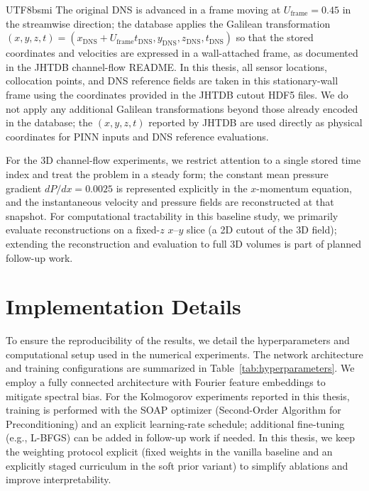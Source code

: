 \documentclass[master]{NTHUthesis}
\begin{document}
\begin{CJK*}{UTF8}{bsmi}
The original DNS is advanced in a frame moving at $U_{\text{frame}} = 0.45$ in the streamwise direction; the database applies the Galilean transformation $(x,y,z,t) = (x_{\text{DNS}} + U_{\text{frame}} t_{\text{DNS}}, y_{\text{DNS}}, z_{\text{DNS}}, t_{\text{DNS}})$ so that the stored coordinates and velocities are expressed in a wall-attached frame, as documented in the JHTDB channel-flow README. In this thesis, all sensor locations, collocation points, and DNS reference fields are taken in this stationary-wall frame using the coordinates provided in the JHTDB cutout HDF5 files.
We do not apply any additional Galilean transformations beyond those already encoded in the database; the $(x,y,z,t)$ reported by JHTDB are used directly as physical coordinates for PINN inputs and DNS reference evaluations.

For the 3D channel-flow experiments, we restrict attention to a single stored time index and treat the problem in a steady form; the constant mean pressure gradient $dP/dx = 0.0025$ is represented explicitly in the $x$-momentum equation, and the instantaneous velocity and pressure fields are reconstructed at that snapshot. For computational tractability in this baseline study, we primarily evaluate reconstructions on a fixed-$z$ $x$--$y$ slice (a 2D cutout of the 3D field); extending the reconstruction and evaluation to full 3D volumes is part of planned follow-up work.

\section{Implementation Details}
\label{sec:implementation}

To ensure the reproducibility of the results, we detail the hyperparameters and computational setup used in the numerical experiments.
The network architecture and training configurations are summarized in Table~\ref{tab:hyperparameters}.
We employ a fully connected architecture with Fourier feature embeddings to mitigate spectral bias.
For the Kolmogorov experiments reported in this thesis, training is performed with the SOAP optimizer (Second-Order Algorithm for Preconditioning) and an explicit learning-rate schedule; additional fine-tuning (e.g., L-BFGS) can be added in follow-up work if needed.
In this thesis, we keep the weighting protocol explicit (fixed weights in the vanilla baseline and an explicitly staged curriculum in the soft prior variant) to simplify ablations and improve interpretability.


\end{CJK*}
\end{document}
